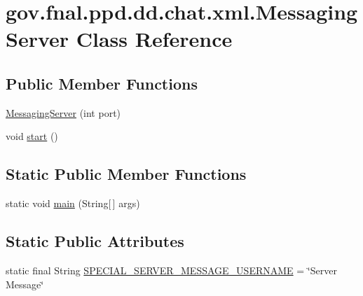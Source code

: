 \hypertarget{classgov_1_1fnal_1_1ppd_1_1dd_1_1chat_1_1xml_1_1MessagingServer}{\section{gov.\-fnal.\-ppd.\-dd.\-chat.\-xml.\-Messaging\-Server Class Reference}
\label{classgov_1_1fnal_1_1ppd_1_1dd_1_1chat_1_1xml_1_1MessagingServer}
}
\subsection*{Public Member Functions}
\begin{DoxyCompactItemize}
\item 
\hyperlink{classgov_1_1fnal_1_1ppd_1_1dd_1_1chat_1_1xml_1_1MessagingServer_a30d87c4d7e8e05b5b6d8785c6e3eef28}{Messaging\-Server} (int port)
\item 
void \hyperlink{classgov_1_1fnal_1_1ppd_1_1dd_1_1chat_1_1xml_1_1MessagingServer_a3220e534a53110da48c7e5f6df040d9b}{start} ()
\end{DoxyCompactItemize}
\subsection*{Static Public Member Functions}
\begin{DoxyCompactItemize}
\item 
static void \hyperlink{classgov_1_1fnal_1_1ppd_1_1dd_1_1chat_1_1xml_1_1MessagingServer_a21789d252cd214b1a9c90191e0e099f5}{main} (String\mbox{[}$\,$\mbox{]} args)
\end{DoxyCompactItemize}
\subsection*{Static Public Attributes}
\begin{DoxyCompactItemize}
\item 
static final String \hyperlink{classgov_1_1fnal_1_1ppd_1_1dd_1_1chat_1_1xml_1_1MessagingServer_a5c67a54a24cf497a06663dc39bea297c}{S\-P\-E\-C\-I\-A\-L\-\_\-\-S\-E\-R\-V\-E\-R\-\_\-\-M\-E\-S\-S\-A\-G\-E\-\_\-\-U\-S\-E\-R\-N\-A\-M\-E} = \char`\"{}Server Message\char`\"{}
\end{DoxyCompactItemize}
